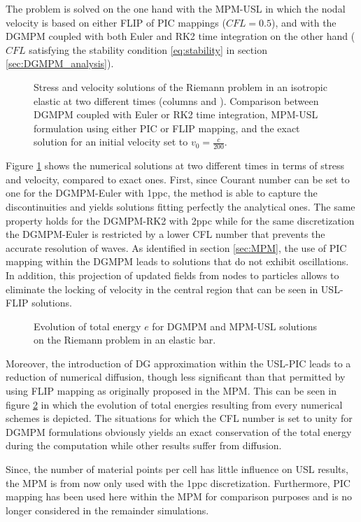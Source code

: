 The problem is solved on the one hand with the MPM-USL in which the nodal velocity is based on either FLIP of PIC mappings ($CFL=0.5$), and with the DGMPM coupled with both Euler and RK2 time integration on the other hand ($CFL$ satisfying the stability condition \eqref{eq:stability} in section \ref{sec:DGMPM_analysis}).
\begin{figure}[h!]
  \centering
  { \label{subfig:rp_elastic1}}
  { \label{subfig:rp_elastic2}}
  
  \caption{Stress and velocity solutions of the Riemann problem in an isotropic elastic at two different times (columns  and ). Comparison between DGMPM coupled with Euler or RK2 time integration, MPM-USL formulation using either PIC or FLIP mapping, and the exact solution for an initial velocity set to $v_0=\frac{c}{200}$.}
  \label{fig:elastic_stress}
\end{figure}
Figure \ref{fig:elastic_stress} shows the numerical solutions at two different times in terms of stress and velocity, compared to exact ones. 
First, since Courant number can be set to one for the DGMPM-Euler with 1ppc, the method is able to capture the discontinuities and yields solutions fitting perfectly the analytical ones. The same property holds for the DGMPM-RK2 with 2ppc while for the same discretization the DGMPM-Euler is restricted by a lower CFL number that prevents the accurate resolution of waves.
As identified in section \ref{sec:MPM}, the use of PIC mapping within the DGMPM leads to solutions that do not exhibit oscillations.
In addition, this projection of updated fields from nodes to particles allows to eliminate the locking of velocity in the central region that can be seen in USL-FLIP solutions.
\begin{figure}[h!]
  \centering
  
  \caption{Evolution of total energy $e$ for DGMPM and MPM-USL solutions on the Riemann problem in an elastic bar.}
  \label{fig:energy_elastic_RP}
\end{figure}
Moreover, the introduction of DG approximation within the USL-PIC leads to a reduction of numerical diffusion, though less significant than that permitted by using FLIP mapping as originally proposed in the MPM.
This can be seen in figure \ref{fig:energy_elastic_RP} in which the evolution of total energies resulting from every numerical schemes is depicted.
The situations for which the CFL number is set to unity for DGMPM formulations obviously yields an exact conservation of the total energy during the computation while other results suffer from diffusion.

Since, the number of material points per cell has little influence on USL results, the MPM is from now only used with the 1ppc discretization.
Furthermore, PIC mapping has been used here within the MPM for comparison purposes and is no longer considered in the remainder simulations.
